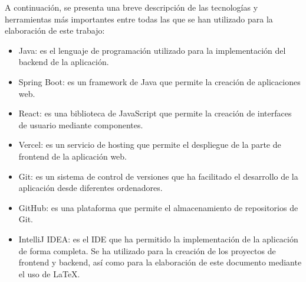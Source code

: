 A continuación, se presenta una breve descripción de las tecnologías y herramientas más importantes entre todas las que
se han utilizado para la elaboración de este trabajo:

\begin{itemize}
	\item Java: es el lenguaje de programación utilizado para la implementación del backend de la aplicación.
	\item Spring Boot: es un framework de Java que permite la creación de aplicaciones web.
	\item React: es una biblioteca de JavaScript que permite la creación de interfaces de usuario mediante componentes.
	\item Vercel: es un servicio de hosting que permite el despliegue de la parte de frontend de la aplicación web.
	\item Git: es un sistema de control de versiones que ha facilitado el desarrollo de la aplicación desde diferentes
	ordenadores.
	\item GitHub: es una plataforma que permite el almacenamiento de repositorios de Git.
	\item IntelliJ IDEA: es el IDE que ha permitido la implementación de la aplicación de forma completa.
	Se ha utilizado para la creación de los proyectos de frontend y backend, así como para la
	elaboración de este documento mediante el uso de \LaTeX.
\end{itemize}
